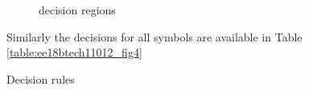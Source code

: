 \begin{enumerate}[label=\thesubsection.\arabic*.,ref=\thesubsection.\theenumi]
\begin{figure}[!ht]
                \resizebox{\columnwidth}{!}{}

\caption{decision regions}
\label{fig:ee18btech11012_fig2}
	
\end{figure}

%
%
%	
Similarly the decisions for all symbols 
are available in Table \ref{table:ee18btech11012_fig4}
%
\begin{table}[!ht]
                \resizebox{\columnwidth}{!}{}
\caption{Decision rules}
\label{table:ee18btech11012_fig4}
\end{table}



\end{enumerate}
